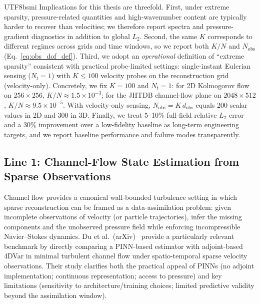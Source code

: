 \documentclass[master]{NTHUthesis}
\begin{document}
\begin{CJK*}{UTF8}{bsmi}
Implications for this thesis are threefold. First, under extreme sparsity, pressure-related quantities and high-wavenumber content are typically harder to recover than velocities; we therefore report spectra and pressure-gradient diagnostics in addition to global $L_2$. Second, the same $K$ corresponds to different regimes across grids and time windows, so we report both $K/N$ and $N_{\text{obs}}$ (Eq.~\eqref{eq:obs_dof_def}). Third, we adopt an \emph{operational} definition of ``extreme sparsity'' consistent with practical probe-limited settings: single-instant Eulerian sensing ($N_t=1$) with $K\le 100$ velocity probes on the reconstruction grid (velocity-only). Concretely, we fix $K=100$ and $N_t=1$: for 2D Kolmogorov flow on $256\times256$, $K/N \approx 1.5\times10^{-3}$; for the JHTDB channel-flow plane on $2048\times512$, $K/N \approx 9.5\times10^{-5}$. With velocity-only sensing, $N_{\text{obs}}=K\,d_{\text{obs}}$ equals 200 scalar values in 2D and 300 in 3D. Finally, we treat 5--10\% full-field relative $L_2$ error and a 30\% improvement over a low-fidelity baseline as long-term engineering targets, and we report baseline performance and failure modes transparently.

\subsection{Line 1: Channel-Flow State Estimation from Sparse Observations}
\label{sec:lit_line1_channel}

Channel flow provides a canonical wall-bounded turbulence setting in which sparse reconstruction can be framed as a data-assimilation problem: given incomplete observations of velocity (or particle trajectories), infer the missing components and the unobserved pressure field while enforcing incompressible Navier--Stokes dynamics. Du et al.\ (arXiv)~\cite{du2022stateestimationminimalturbulent} provide a particularly relevant benchmark by directly comparing a PINN-based estimator with adjoint-based 4DVar in minimal turbulent channel flow under spatio-temporal sparse velocity observations. Their study clarifies both the practical appeal of PINNs (no adjoint implementation; continuous representation; access to pressure) and key limitations (sensitivity to architecture/training choices; limited predictive validity beyond the assimilation window).


\end{CJK*}
\end{document}
